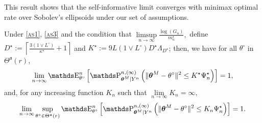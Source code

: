This result shows that the self-informative limit converges with minimax optimal rate over Sobolev's ellipsoids under our set of assumptions.

\begin{thm}\label{thm6}
Under \textsc{\cref{as1}}, \textsc{\cref{as3}} and the condition that $\limsup\limits_{n \rightarrow \infty} \frac{\log\left(G_{n}\right)}{m_{n}^{\star}},$ define $D^{\star} := \left\lceil \frac{3 \left(1 \vee L^{\circ}\right)}{\kappa^{\star}} + 1 \right\rceil$ and $K^{\star} := 9 L \left(1 \vee L^{\circ} \right) D^{\star} \Lambda_{D^{\star}}$; then, we have for all $\theta^{\circ}$ in $\Theta^{\mathfrak{a}}(r)$,
\[\lim\limits_{n \rightarrow \infty} \E_{\theta^{\circ}}^{n}\left[\P_{\boldsymbol{\theta}^{M} \vert Y^{n}}^{n, (\infty)}\left(\Vert \boldsymbol{\theta}^{M} - \theta^{\circ} \Vert^{2} \leq K^{\star} \Psi_{n}^{\star} \right)\right] = 1,\]
and, for any increasing function $K_{n}$ such that $\lim\limits_{n \rightarrow \infty} K_{n} = \infty,$
\[\lim\limits_{n \rightarrow \infty} \sup\limits_{\theta^{\circ} \in \Theta^{\mathfrak{a}}(r)} \E_{\theta^{\circ}}^{n}\left[\P_{\boldsymbol{\theta}^{M} \vert Y^{n}}^{n, (\infty)}\left(\Vert \boldsymbol{\theta}^{M} - \theta^{\circ} \Vert^{2} \leq K_{n} \Psi_{n}^{\star} \right)\right] = 1.\]
\end{thm}